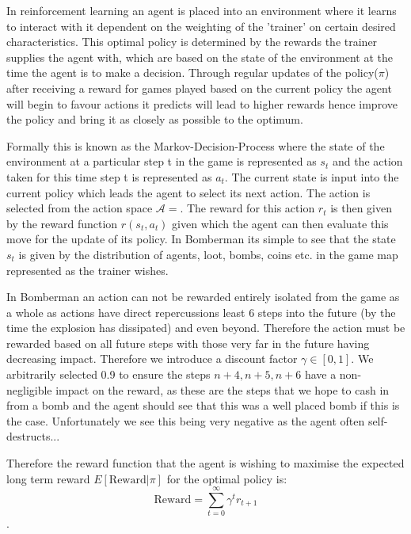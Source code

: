 In reinforcement learning an agent is placed into an environment where it learns to interact with it dependent on the weighting of the 'trainer' on certain desired characteristics. This optimal policy is determined by the rewards the trainer supplies the agent with, which are based on the state of the environment at the time the agent is to make a decision. Through regular updates of the policy($\pi$) after receiving a reward for games played based on the current policy the agent will begin to favour actions it predicts will lead to higher rewards hence improve the policy and bring it as closely as possible to the optimum.

Formally this is known as the Markov-Decision-Process where the state of the environment at a particular step t in the game is represented as \(s_t\) and the action taken for this time step t is represented as $a_t$. The current state is input into the current policy which leads the agent to select its next action. The action is selected from the action space $\mathcal{A} = $. The reward for this action $r_t$ is then given by the reward function $r(s_t, a_t)$ given which the agent can then evaluate this move for the update of its policy. In Bomberman its simple to see that the state $s_t$ is given by the distribution of agents, loot, bombs, coins etc. in the game map represented as the trainer wishes. 

In Bomberman an action can not be rewarded entirely isolated from the game as a whole as actions have direct repercussions least 6 steps into the future (by the time the explosion has dissipated) and even beyond. Therefore the action must be rewarded based on all future steps with those very far in the future having decreasing impact. Therefore we introduce a discount factor $\gamma \in [0, 1]$. We arbitrarily selected 0.9 to ensure the steps $n+4, n+5, n+6$ have a non-negligible impact on the reward, as these are the steps that we hope to cash in from a bomb and the agent should see that this was a well placed bomb if this is the case. Unfortunately we see this being very negative as the agent often self-destructs...

Therefore the reward function that the agent is wishing to maximise the expected long term reward $E[\text{Reward}|\pi]$ for the optimal policy is: $$\text{Reward} = \sum_{t=0}^{\infty} \gamma^t r_{t+1}$$. 

